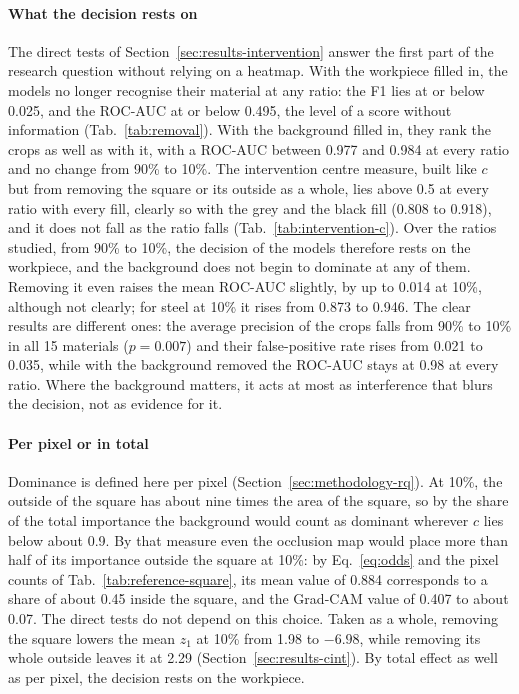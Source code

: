 \paragraph{What the decision rests on}
The direct tests of Section~\ref{sec:results-intervention} answer the first part of
the research question without relying on a heatmap. With the workpiece filled in, the
models no longer recognise their material at any ratio: the F1 lies at or below 0.025,
and the ROC-AUC at or below 0.495, the level of a score without information
(Tab.~\ref{tab:removal}). With the background filled in, they rank the crops as well as
with it, with a ROC-AUC between 0.977 and 0.984 at every ratio and no change from
90\% to 10\%. The intervention centre measure, built like $c$ but from removing the
square or its outside as a whole, lies above 0.5 at every ratio with every fill, clearly
so with the grey and the black fill (0.808 to 0.918), and it does not fall as the ratio
falls (Tab.~\ref{tab:intervention-c}). Over the ratios studied, from 90\% to 10\%, the
decision of the models therefore rests on the workpiece, and the background does not
begin to dominate at any of them. Removing it even raises the mean ROC-AUC slightly, by
up to 0.014 at 10\%, although not clearly; for steel at 10\% it rises from 0.873 to
0.946. The clear results are different ones: the average precision of the crops falls
from 90\% to 10\% in all 15 materials ($p = 0.007$) and their false-positive rate rises
from 0.021 to 0.035, while with the background removed the ROC-AUC stays at 0.98 at every
ratio. Where the background matters, it acts at most as interference that blurs the
decision, not as evidence for it.

\paragraph{Per pixel or in total}
Dominance is defined here per pixel (Section~\ref{sec:methodology-rq}). At 10\%, the
outside of the square has about nine times the area of the square, so by the share of
the total importance the background would count as dominant wherever $c$ lies below
about 0.9. By that measure even the occlusion map would place more than half of its
importance outside the square at 10\%: by Eq.~\eqref{eq:odds} and the pixel counts of
Tab.~\ref{tab:reference-square}, its mean value of 0.884 corresponds to a share of about
0.45 inside the square, and the Grad-CAM value of 0.407 to about 0.07. The direct tests
do not depend on this choice. Taken as a whole, removing the square lowers the mean
$z_1$ at 10\% from 1.98 to $-6.98$, while removing its whole outside leaves it at 2.29
(Section~\ref{sec:results-cint}). By total effect as well as per pixel, the decision
rests on the workpiece.

